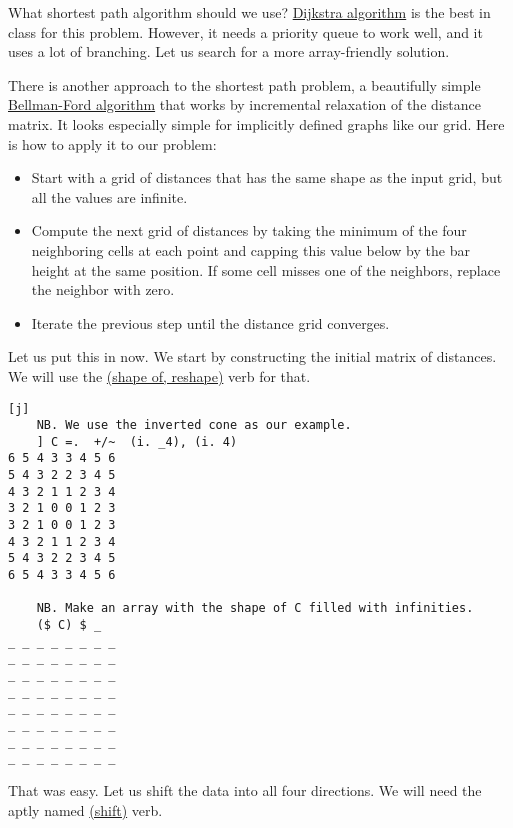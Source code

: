 \documentclass{article}
\begin{document}
What shortest path algorithm should we use?
\href{https://en.wikipedia.org/wiki/Dijkstra%27s_algorithm}{Dijkstra algorithm} is the best in class for this problem.
However, it needs a priority queue to work well, and it uses a lot of branching.
Let us search for a more array-friendly solution.

There is another approach to the shortest path problem, a beautifully simple \href{https://en.wikipedia.org/wiki/Bellman%E2%80%93Ford_algorithm}{Bellman-Ford algorithm} that works by incremental relaxation of the distance matrix.
It looks especially simple for implicitly defined graphs like our grid.
Here is how to apply it to our problem:

\begin{itemize}
  \item 
    Start with a grid of distances that has the same shape as the input grid, but all the values are infinite.
  \item 
    Compute the next grid of distances by taking the minimum of the four neighboring cells at each point and capping this value below by the bar height at the same position.
    If some cell misses one of the neighbors, replace the neighbor with zero.
  \item Iterate the previous step until the distance grid converges.
\end{itemize}

Let us put this in  now.
We start by constructing the initial matrix of distances.
We will use the \href{https://code.jsoftware.com/wiki/Vocabulary/dollar}{\code{$} (shape of, reshape)} verb for that.

\begin{verbatim}[j]
    NB. We use the inverted cone as our example.
    ] C =.  +/~  (i. _4), (i. 4)
6 5 4 3 3 4 5 6
5 4 3 2 2 3 4 5
4 3 2 1 1 2 3 4
3 2 1 0 0 1 2 3
3 2 1 0 0 1 2 3
4 3 2 1 1 2 3 4
5 4 3 2 2 3 4 5
6 5 4 3 3 4 5 6

    NB. Make an array with the shape of C filled with infinities.
    ($ C) $ _
_ _ _ _ _ _ _ _
_ _ _ _ _ _ _ _
_ _ _ _ _ _ _ _
_ _ _ _ _ _ _ _
_ _ _ _ _ _ _ _
_ _ _ _ _ _ _ _
_ _ _ _ _ _ _ _
_ _ _ _ _ _ _ _
\end{verbatim}

That was easy.
Let us shift the data into all four directions.
We will need the aptly named \href{https://code.jsoftware.com/wiki/Vocabulary/bardot#dyadicfit}{ (shift)} verb.
\end{document}
